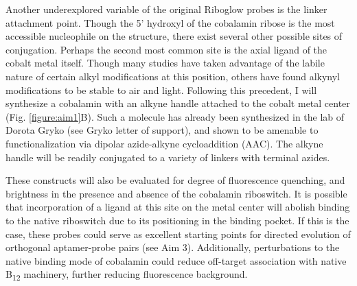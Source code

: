 Another underexplored variable of the original Riboglow probes is the linker attachment point.
Though the 5' hydroxyl of the cobalamin ribose is the most accessible nucleophile on the structure, there exist several other possible sites of conjugation.
Perhaps the second most common site is the axial ligand of the cobalt metal itself.
Though many studies have taken advantage of the labile nature of certain alkyl modifications at this position\cite{ShellVitaminB12Tunable2015}, others have found alkynyl modifications to be stable to air and light\cite{ChrominskiReductionfreesynthesisstable2013,RuetzMarkusPhenylethynylcobalaminLightStable2013}.
Following this precedent, I will synthesize a cobalamin with an alkyne handle attached to the cobalt metal center (Fig. \ref{figure:aim1}B).
Such a molecule has already been synthesized in the lab of Dorota Gryko (see Gryko letter of support), and shown to be amenable to functionalization via dipolar azide-alkyne cycloaddition (AAC)\cite{ChrominskiVitaminB12Derivatives2014}.
The alkyne handle will be readily conjugated to a variety of linkers with terminal azides\cite{KolbHartmuthC.ClickChemistryDiverse2001,PattersonFindingRightBioorthogonal2014}.

These constructs will also be evaluated for degree of fluorescence quenching, and brightness in the presence and absence of the cobalamin riboswitch.
It is possible that incorporation of a ligand at this site on the metal center will abolish binding to the native riboswitch due to its positioning in the binding pocket\cite{JohnsonJrB12cofactorsdirectly2012}.
If this is the case, these probes could serve as excellent starting points for directed evolution of orthogonal aptamer-probe pairs (see Aim 3). %
Additionally, perturbations to the native binding mode of cobalamin could reduce off-target association with native B\textsubscript{12} machinery\cite{PathareSynthesisCobalaminBiotin1996}, further reducing fluorescence background.

